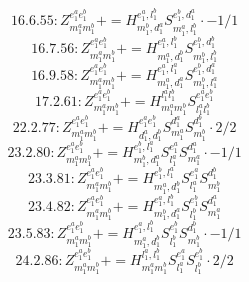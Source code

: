 \documentclass[letterpaper,10pt,fleqn,leqno,onecolumn]{article}
\begin{document}
\begin{equation} \;\;\;\;\;\;  16.6.55: Z^{e_{1}^{a}e_{1}^{b}}_{m_{1}^{a}m_{1}^{b}}+=H^{e_{1}^{a},l_{1}^{b}}_{m_{1}^{b},d_{1}^{a}}S^{e_{1}^{b},d_{1}^{a}}_{m_{1}^{a},l_{1}^{b}}\cdot -1/1 \end{equation}
\begin{equation} \;\;\;\;\;\;  16.7.56: Z^{e_{1}^{a}e_{1}^{b}}_{m_{1}^{a}m_{1}^{b}}+=H^{e_{1}^{a},l_{1}^{b}}_{m_{1}^{a},d_{1}^{b}}S^{e_{1}^{b},d_{1}^{b}}_{m_{1}^{b},l_{1}^{b}} \end{equation}
\begin{equation} \;\;\;\;\;\;  16.9.58: Z^{e_{1}^{a}e_{1}^{b}}_{m_{1}^{a}m_{1}^{b}}+=H^{e_{1}^{a},l_{1}^{a}}_{m_{1}^{a},d_{1}^{a}}S^{e_{1}^{b},d_{1}^{a}}_{m_{1}^{b},l_{1}^{a}} \end{equation}
\begin{equation} \;\;\;\;\;\;  17.2.61: Z^{e_{1}^{a}e_{1}^{b}}_{m_{1}^{a}m_{1}^{b}}+=H^{l_{1}^{a}l_{1}^{b}}_{m_{1}^{a}m_{1}^{b}}S^{e_{1}^{a}e_{1}^{b}}_{l_{1}^{a}l_{1}^{b}} \end{equation}
\begin{equation} \;\;\;\;\;\;  22.2.77: Z^{e_{1}^{a}e_{1}^{b}}_{m_{1}^{a}m_{1}^{b}}+=H^{e_{1}^{a}e_{1}^{b}}_{d_{1}^{a},d_{1}^{b}}S^{d_{1}^{a}}_{m_{1}^{a}}S^{d_{1}^{b}}_{m_{1}^{b}}\cdot 2/2 \end{equation}
\begin{equation} \;\;\;\;\;\;  23.2.80: Z^{e_{1}^{a}e_{1}^{b}}_{m_{1}^{a}m_{1}^{b}}+=H^{e_{1}^{b},l_{1}^{a}}_{m_{1}^{b},d_{1}^{a}}S^{e_{1}^{a}}_{l_{1}^{a}}S^{d_{1}^{a}}_{m_{1}^{a}}\cdot -1/1 \end{equation}
\begin{equation} \;\;\;\;\;\;  23.3.81: Z^{e_{1}^{a}e_{1}^{b}}_{m_{1}^{a}m_{1}^{b}}+=H^{e_{1}^{b},l_{1}^{a}}_{m_{1}^{a},d_{1}^{b}}S^{e_{1}^{a}}_{l_{1}^{a}}S^{d_{1}^{b}}_{m_{1}^{b}} \end{equation}
\begin{equation} \;\;\;\;\;\;  23.4.82: Z^{e_{1}^{a}e_{1}^{b}}_{m_{1}^{a}m_{1}^{b}}+=H^{e_{1}^{a},l_{1}^{b}}_{m_{1}^{b},d_{1}^{a}}S^{e_{1}^{b}}_{l_{1}^{b}}S^{d_{1}^{a}}_{m_{1}^{a}} \end{equation}
\begin{equation} \;\;\;\;\;\;  23.5.83: Z^{e_{1}^{a}e_{1}^{b}}_{m_{1}^{a}m_{1}^{b}}+=H^{e_{1}^{a},l_{1}^{b}}_{m_{1}^{a},d_{1}^{b}}S^{e_{1}^{b}}_{l_{1}^{b}}S^{d_{1}^{b}}_{m_{1}^{b}}\cdot -1/1 \end{equation}
\begin{equation} \;\;\;\;\;\;  24.2.86: Z^{e_{1}^{a}e_{1}^{b}}_{m_{1}^{a}m_{1}^{b}}+=H^{l_{1}^{a},l_{1}^{b}}_{m_{1}^{a}m_{1}^{b}}S^{e_{1}^{a}}_{l_{1}^{a}}S^{e_{1}^{b}}_{l_{1}^{b}}\cdot 2/2 \end{equation}
\end{document}
